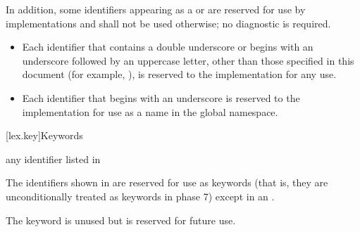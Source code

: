 \pnum
{}%
%
%
In addition, some identifiers
appearing as a  or 
are reserved for use by \Cpp{}
implementations and shall
not be used otherwise; no diagnostic is required.
\begin{itemize}
\item
Each identifier that contains a double underscore
\tcode{\unun}
%
or begins with an underscore followed by
an uppercase letter,
other than those specified in this document
(for example, ),
%
is reserved to the implementation for any use.
\item
Each identifier that begins with an underscore is
%
reserved to the implementation for use as a name in the global namespace.%
\end{itemize}%

[lex.key]{Keywords}

\begin{bnf}
\br
    \textnormal{any identifier listed in }\br
    \br
    \br
\end{bnf}

\pnum
{}%
The identifiers shown in  are reserved for use
as keywords (that is, they are unconditionally treated as keywords in
phase 7) except in an .
\begin{note}
The  keyword is unused but
is reserved for future use.
\end{note}

